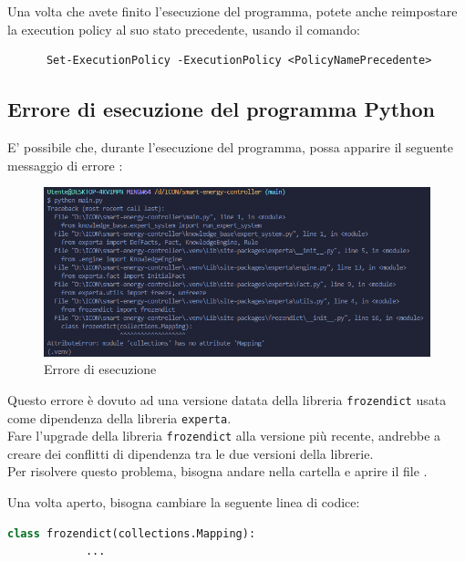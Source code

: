 \documentclass[12pt, letterpaper]{article}
\begin{document}
\noindent Una volta che avete finito l'esecuzione del programma, potete anche reimpostare
la execution policy al suo stato precedente, usando il comando:

\begin{verbatim}
      Set-ExecutionPolicy -ExecutionPolicy <PolicyNamePrecedente>
\end{verbatim}


\subsection{Errore di esecuzione del programma Python}
\label{sec:python-error}

E' possibile che, durante l'esecuzione del programma, possa apparire il seguente
messaggio di errore \cite{python-mapping-problem}: \\ \pagebreak

\begin{figure}[h]
      \centering
      \includegraphics[scale=0.55]{errore-python.png}
      \caption{Errore di esecuzione}
\end{figure}

\noindent Questo errore è dovuto ad una versione datata della libreria \texttt{frozendict}
usata come dipendenza della libreria \texttt{experta}. \\

\noindent Fare l'upgrade della libreria \texttt{frozendict} alla versione più recente, andrebbe a
creare dei conflitti di dipendenza tra le due versioni della librerie. \\

\noindent Per risolvere questo problema, bisogna andare nella cartella
 e aprire il file .

\noindent Una volta aperto, bisogna cambiare la seguente linea di codice: \\

\begin{lstlisting}[language=Python]
      class frozendict(collections.Mapping):
            ...
\end{lstlisting}
\end{document}
